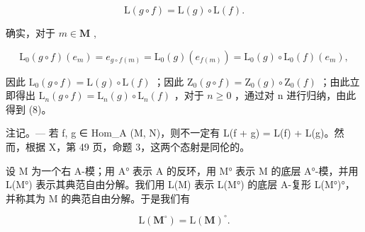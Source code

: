 \[
\mathrm{L} (g \circ f) = \mathrm{L} (g) \circ \mathrm{L} (f).\tag{8}
\]

确实，对于 \(m \in \mathbf{M}\) ,

\[
\mathrm{L} _ {0} (g \circ f) \left(e _ {m}\right) = e _ {g \circ f (m)} = \mathrm{L} _ {0} (g) \left(e _ {f (m)}\right) = \mathrm{L} _ {0} (g) \circ \mathrm{L} _ {0} (f) \left(e _ {m}\right),
\]

因此 \(\mathrm{L}_{0}(g\circ f)=\mathrm{L}(g)\circ\mathrm{L}(f)\) ；因此 \(\mathrm{Z}_{0}(g\circ f)=\mathrm{Z}_{0}(g)\circ\mathrm{Z}_{0}(f)\) ；由此立即得出 \(\mathrm{L}_{n}(g\circ f)=\mathrm{L}_{n}(g)\circ\mathrm{L}_{n}(f)\) ，对于 \(n\geqslant0\) ，通过对 n 进行归纳，由此得到 (8)。

注记。--- 若 f, g ∈ Hom\_A (M, N)，则不一定有 L(f + g) = L(f) + L(g)。然而，根据 X，第 49 页，命题 3，这两个态射是同伦的。

设 M 为一个右 A-模；用 A° 表示 A 的反环，用 M° 表示 M 的底层 A°-模，并用 L(M°) 表示其典范自由分解。我们用 L(M) 表示 L(M°) 的底层 A-复形 L(M°)°，并称其为 M 的典范自由分解。于是我们有

\[
\mathrm{L} (\mathbf {M} ^ {\circ}) = \mathrm{L} (\mathbf {M}) ^ {\circ}.
\]
